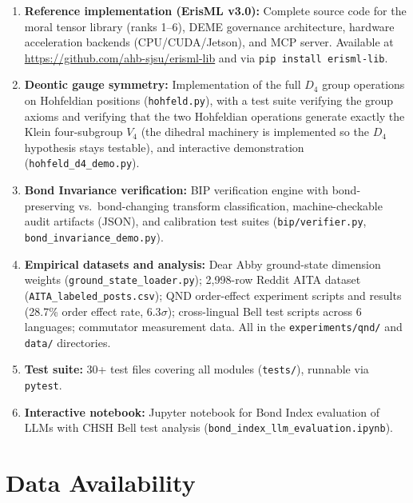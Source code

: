 \documentclass[12pt,letterpaper]{article}
\theoremstyle{definition}
\theoremstyle{remark}
\begin{document}
\begin{enumerate}
    \item \textbf{Reference implementation (ErisML v3.0):} Complete source code for the moral tensor library (ranks 1--6), DEME governance architecture, hardware acceleration backends (CPU/CUDA/Jetson), and MCP server. Available at \url{https://github.com/ahb-sjsu/erisml-lib} and via \texttt{pip install erisml-lib}.

    \item \textbf{Deontic gauge symmetry:} Implementation of the full $D_4$ group operations on Hohfeldian positions (\texttt{hohfeld.py}), with a test suite verifying the group axioms and verifying that the two Hohfeldian operations generate exactly the Klein four-subgroup $V_4$ (the dihedral machinery is implemented so the $D_4$ hypothesis stays testable), and interactive demonstration (\texttt{hohfeld\_d4\_demo.py}).

    \item \textbf{Bond Invariance verification:} BIP verification engine with bond-preserving vs.\ bond-changing transform classification, machine-checkable audit artifacts (JSON), and calibration test suites (\texttt{bip/verifier.py}, \texttt{bond\_invariance\_demo.py}).

    \item \textbf{Empirical datasets and analysis:} Dear Abby ground-state dimension weights (\texttt{ground\_state\_loader.py}); 2,998-row Reddit AITA dataset (\texttt{AITA\_labeled\_posts.csv}); QND order-effect experiment scripts and results (28.7\% order effect rate, $6.3\sigma$); cross-lingual Bell test scripts across 6 languages; commutator measurement data. All in the \texttt{experiments/qnd/} and \texttt{data/} directories.

    \item \textbf{Test suite:} 30+ test files covering all modules (\texttt{tests/}), runnable via \texttt{pytest}.

    \item \textbf{Interactive notebook:} Jupyter notebook for Bond Index evaluation of LLMs with CHSH Bell test analysis (\texttt{bond\_index\_llm\_evaluation.ipynb}).
\end{enumerate}

\section*{Data Availability}
\end{document}
